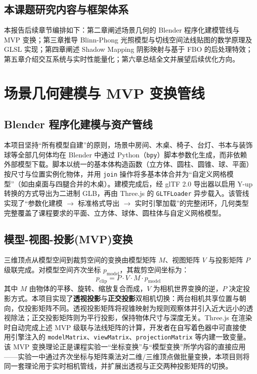 \documentclass[11pt, a4paper, oneside]{report}
\newcommand{\keyword}[1]{\textbf{#1}}
\newcommand{\code}[1]{\texttt{#1}}
\begin{document}
\section{本课题研究内容与框架体系}
本报告后续章节编排如下：第二章阐述场景几何的 Blender 程序化建模管线与 MVP 变换；第三章推导 Blinn-Phong 光照模型与切线空间法线贴图的数学原理及 GLSL 实现；第四章阐述 Shadow Mapping 阴影映射与基于 FBO 的后处理特效；第五章介绍交互系统与实时性能量化；第六章总结全文并展望后续优化方向。

\chapter{场景几何建模与 MVP 变换管线}

\section{Blender 程序化建模与资产管线}
本项目坚持“所有模型自建”的原则，场景中房间、木桌、椅子、台灯、书本与装饰球等全部几何体均在 Blender 中通过 Python（\code{bpy}）脚本参数化生成，而非依赖外部模型下载。脚本以统一的基本体构造函数（立方体、圆柱、圆锥、球、平面）按尺寸与位置实例化物体，并用 \code{join} 操作将多基本体合并为“自定义网格模型”（如由桌面与四腿合并的木桌）。建模完成后，经 glTF 2.0 导出器以启用 Y-up 转换的方式导出为二进制 GLB，再由 Three.js 的 \code{GLTFLoader} 异步载入。该管线实现了“参数化建模 $\rightarrow$ 标准格式导出 $\rightarrow$ 实时引擎加载”的完整闭环，几何类型完整覆盖了课程要求的平面、立方体、球体、圆柱体与自定义网格模型。

\section{模型-视图-投影(MVP)变换}
三维顶点从模型空间到裁剪空间的变换由模型矩阵 $M$、视图矩阵 $V$ 与投影矩阵 $P$ 级联完成。对模型空间齐次坐标 $p_{\text{model}}$，其裁剪空间坐标为：
\begin{equation}
p_{\text{clip}} = P \cdot V \cdot M \cdot p_{\text{model}}
\end{equation}
其中 $M$ 由物体的平移、旋转、缩放复合而成，$V$ 为相机世界变换的逆，$P$ 决定投影方式。本项目实现了\keyword{透视投影}与\keyword{正交投影}双相机切换：两台相机共享位置与朝向，仅投影矩阵不同。透视投影矩阵将视锥映射为规则观察体并引入近大远小的透视除法；正交投影矩阵则为平行投影，保持物体尺寸与深度无关。Three.js 在渲染时自动完成上述 MVP 级联与法线矩阵的计算，开发者在自写着色器中可直接使用引擎注入的 \code{modelMatrix}、\code{viewMatrix}、\code{projectionMatrix} 等内建一致变量。该 MVP 变换理论正是课程实验一“坐标变换”与“模型变换”所学内容的直接应用——实验一中通过齐次坐标与矩阵乘法对二维/三维顶点做批量变换，本项目则将同一套理论用于实时相机管线，并扩展出透视与正交两种投影矩阵的切换。
\end{document}
